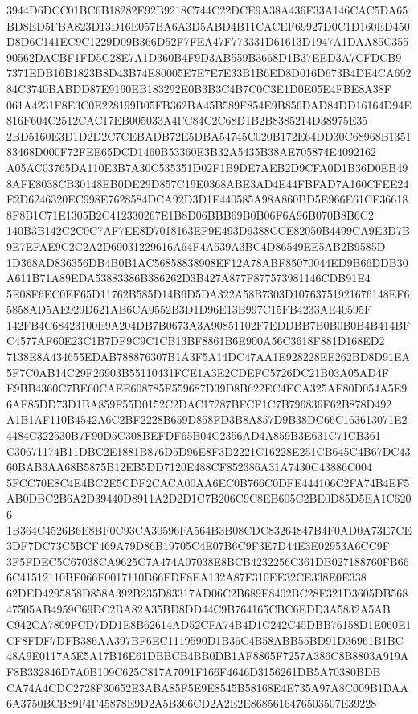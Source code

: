 \documentclass[UTF8,fontset=fandol,zihao=-4,a4paper]{ctexart}
\begin{document}
{{3944D6DCC01BC6B18282E92B9218C744C22DCE9A38A436F33A146CAC5DA65BD8ED5FBA823D13D16E057BA6A3D5ABD4B11CACEF69927D0C1D160ED450
D8D6C141EC9C1229D09B366D52F7FEA47F773331D61613D1947A1DAA85C35590562DACBF1FD5C28E7A1D360B4F9D3AB559B3668D1B37EED3A7CFDCB9
7371EDB16B1823B8D43B74E80005E7E7E7E33B1B6ED8D016D673B4DE4CA69284C3740BABDD87E9160EB183292E0B3B3C4B7C0C3E1D0E05E4FBE8A38F
061A4231F8E3C0E228199B05FB362BA45B589F854E9B856DAD84DD16164D94E816F604C2512CAC17EB005033A4FC84C2C68D1B2B8385214D38975E35
2BD5160E3D1D2D2C7CEBADB72E5DBA54745C020B172E64DD30C68968B135183468D000F72FEE65DCD1460B53360E3B32A5435B38AE705874E4092162
A05AC03765DA110E3B7A30C535351D02F1B9DE7AEB2D9CFA0D1B36D0EB498AFE8038CB30148EB0DE29D857C19E0368ABE3AD4E44FBFAD7A160CFEE24
E2D6246320EC998E7628584DCA92D3D1F440585A98A860BD5E966E61CF366188F8B1C71E1305B2C412330267E1B8D06BBB69B0B06F6A96B070B8B6C2
140B3B142C2C0C7AF7EE8D7018163EF9E493D9388CCE82050B4499CA9E3D7B9E7EFAE9C2C2A2D69031229616A64F4A539A3BC4D86549EE5AB2B9585D
1D368AD836356DB4B0B1AC56858838908EF12A78ABF85070044ED9B66DDB30A611B71A89EDA53883386B386262D3B427A877F877573981146CDB91E4
5E08F6EC0EF65D11762B585D14B6D5DA322A58B7303D10763751921676148EF65858AD5AE929D621AB6CA9552B3D1D96E13B997C15FB4233AE40595F
142FB4C68423100E9A204DB7B0673A3A90851102F7EDDBB7B0B0B0B4B414BFC4577AF60E23C1B7DF9C9C1CB13BF8861B6E900A56C3618F881D168ED2
7138E8A434655EDAB788876307B1A3F5A14DC47AA1E928228EE262BD8D91EA5F7C0AB14C29F26903B55110431FCE1A3E2CDEFC5726DC21B03A05AD4F
E9BB4360C7BE60CAEE608785F559687D39D8B622EC4ECA325AF80D054A5E96AF85DD73D1BA859F55D0152C2DAC17287BFCF1C7B796836F62B878D492
A1B1AF110B4542A6C2BF2228B659D858FD3B8A857D9B38DC66C163613071E24484C322530B7F90D5C308BEFDF65B04C2356AD4A859B3E631C71CB361
C30671174B11DBC2E1881B876D5D96E8F3D2221C16228E251CB645C4B67DC4360BAB3AA68B5875B12EB5DD7120E488CF852386A31A7430C43886C004
5FCC70E8C4E4BC2E5CDF2CACA00AA6EC0B766C0DFE444106C2FA74B4EF5AB0DBC2B6A2D39440D8911A2D2D1C7B206C9C8EB605C2BE0D85D5EA1C6206
1B364C4526B6E8BF0C93CA30596FA564B3B08CDC83264847B4F0AD0A73E7CE3DF7DC73C5BCF469A79D86B19705C4E07B6C9F3E7D44E3E02953A6CC9F
3F5FDEC5C67038CA9625C7A474A07038E8BCB4232256C361DB027188760FB666C41512110BF066F0017110B66FDF8EA132A87F310EE32CE338E0E338
62DED4295858D858A392B235D83317AD06C2B689E8402BC28E321D3605DB56847505AB4959C69DC2BA82A35BD8DD44C9B764165CBC6EDD3A5832A5AB
C942CA7809FCD7DD1E8B62614AD52CFA74B4D1C242C45DBB76158D1E060E1CF8FDF7DFB386AA397BF6EC1119590D1B36C4B58ABB55BD91D36961B1BC
48A9E0117A5E5A17B16E61DBBCB4BB0DB1AF8865F7257A386C8B8803A919AF8B332846D7A0B109C625C817A7091F166F4646D3156261DB5A70380BDB
CA74A4CDC2728F30652E3ABA85F5E9E8545B58168E4E735A97A8C009B1DAA6A3750BCB89F4F45878E9D2A5B366CD2A2E2E8685616476503507E39228
}}
\end{document}
